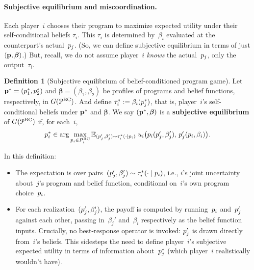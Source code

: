 \documentclass[sigconf]{aamas}
\newcommand{\eqscbi}{\tau_i^*}
\newcommand{\fullbf}{\boldsymbol{\beta}}
\theoremstyle{definition}
\newtheorem{definition}{Definition} %
\newcommand{\bcprogspacei}{P^{\mathrm{BC}}_i}
\newcommand{\allbcprog}{\mathcal{P}^{\mathrm{BC}}}
\begin{document}
\paragraph{Subjective equilibrium and miscoordination.} Each player~$i$ chooses their program to maximize expected utility under their 
self-conditional beliefs $\tau_i$.
This $\tau_i$ is determined by~$\beta_i$ evaluated at the counterpart's actual~$p_j$. (So, we can define subjective equilibrium in terms of just $(\fullprog, \fullbf)$.) But, recall, we do not assume player~$i$ \textit{knows} the actual~$p_j$, only the output~$\tau_i$.

\begin{definition}[Subjective equilibrium of belief-conditioned program game]
\label{def:bcpg-subjeq}
Let $\textbf{p}^* = (p_1^*, p_2^*)$ and $\fullbf = (\beta_1, \beta_2)$ be profiles of programs and belief functions, respectively, in $\game(\allbcprog)$.
And define $\eqscbi := \beta_i(\eqprogj)$, that is,
player~$i$'s self-conditional beliefs under $\textbf{p}^*$ and $\fullbf$.
We say $(\fulleq, \fullbf)$ is a \textbf{subjective equilibrium} of $\game(\allbcprog)$ if, for each~$i$,
$$
\eqprogi \in \arg\max_{\progi \in \bcprogspacei}
\mathbb{E}_{(\progj', \beta_j') \sim \eqscbi(\cdot \mid \progi)} \; \payi\bigl(\progi(\progj', \beta_j'),\, \progj'(\progi, \beta_i)\bigr).
$$
\end{definition}

In this definition:
\begin{itemize}
    \item The expectation is over pairs~$(\progj', \beta_j') \sim \eqscbi(\cdot \mid \progi)$, i.e., $i$'s joint uncertainty about~$j$'s program and belief function, conditional on~$i$'s own program choice~$p_i$.
    \item For each realization~$(p_j', \beta_j')$, the payoff is computed by running~$p_i$ and~$p_j'$ against each other, passing in~$\beta_j'$ and~$\beta_i$ respectively as the belief function inputs. Crucially, no best-response operator is invoked: $p_j'$ is drawn directly from~$i$'s beliefs.
    This sidesteps the need to define player~$i$'s subjective expected utility in terms of information
    about~$p_j^*$ (which player~$i$ realistically wouldn't have).
\end{itemize}
\end{document}
